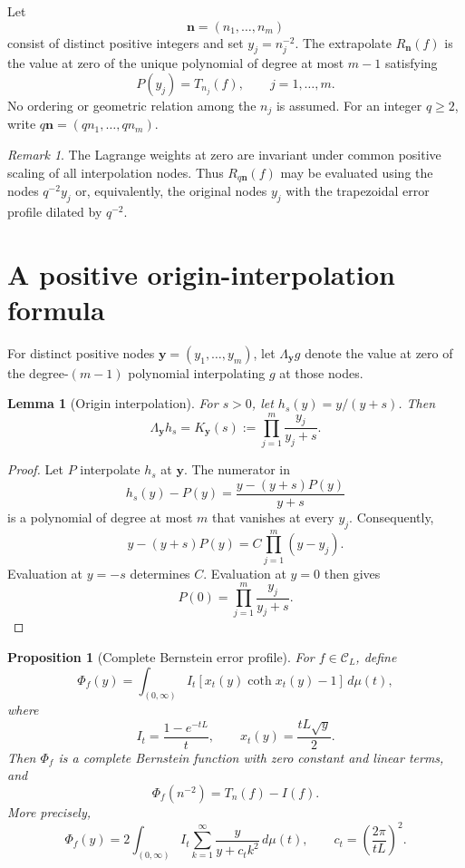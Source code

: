 \documentclass[11pt]{article}
\newtheorem{lemma}[theorem]{Lemma}
\newtheorem{proposition}[theorem]{Proposition}
\theoremstyle{definition}
\theoremstyle{remark}
\newtheorem{remark}[theorem]{Remark}
\newcommand{\cC}{\mathcal{C}}
\newcommand{\bN}{\boldsymbol{n}}
\newcommand{\bY}{\boldsymbol{y}}
\newcommand{\1}{\mathbf{1}}
\begin{document}
Let
\[
\bN=(n_1,\ldots,n_m)
\]
consist of distinct positive integers and set \(y_j=n_j^{-2}\). The
extrapolate \(R_{\bN}(f)\) is the value at zero of the unique polynomial of
degree at most \(m-1\) satisfying
\[
P(y_j)=T_{n_j}(f),\qquad j=1,\ldots,m.
\]
No ordering or geometric relation among the \(n_j\) is assumed. For an integer
\(q\ge2\), write \(q\bN=(qn_1,\ldots,qn_m)\).

\begin{remark}
The Lagrange weights at zero are invariant under common positive scaling of
all interpolation nodes. Thus \(R_{q\bN}(f)\) may be evaluated using the
nodes \(q^{-2}y_j\) or, equivalently, the original nodes \(y_j\) with the
trapezoidal error profile dilated by \(q^{-2}\).
\end{remark}

\section{A positive origin-interpolation formula}

For distinct positive nodes \(\bY=(y_1,\ldots,y_m)\), let
\(\Lambda_{\bY}g\) denote the value at zero of the degree-\((m-1)\)
polynomial interpolating \(g\) at those nodes.

\begin{lemma}[Origin interpolation]
\label{lem:origin}
For \(s>0\), let \(h_s(y)=y/(y+s)\). Then
\begin{equation}
\Lambda_{\bY}h_s
=K_{\bY}(s)
:=\prod_{j=1}^{m}\frac{y_j}{y_j+s}.
\label{eq:kernel}
\end{equation}
\end{lemma}

\begin{proof}
Let \(P\) interpolate \(h_s\) at \(\bY\). The numerator in
\[
h_s(y)-P(y)
=\frac{y-(y+s)P(y)}{y+s}
\]
is a polynomial of degree at most \(m\) that vanishes at every \(y_j\).
Consequently,
\[
y-(y+s)P(y)=C\prod_{j=1}^{m}(y-y_j).
\]
Evaluation at \(y=-s\) determines \(C\). Evaluation at \(y=0\) then gives
\[
P(0)=\prod_{j=1}^{m}\frac{y_j}{y_j+s}.
\]
\end{proof}

\begin{proposition}[Complete Bernstein error profile]
\label{prop:cbf}
For \(f\in\cC_L\), define
\begin{equation}
\Phi_f(y)
=
\int_{(0,\infty)}
I_t\left[x_t(y)\coth x_t(y)-1\right]\,d\mu(t),
\label{eq:error-profile}
\end{equation}
where
\[
I_t=\frac{1-e^{-tL}}{t},
\qquad
x_t(y)=\frac{tL\sqrt{y}}{2}.
\]
Then \(\Phi_f\) is a complete Bernstein function with zero constant and
linear terms, and
\begin{equation}
\Phi_f(n^{-2})=T_n(f)-I(f).
\label{eq:profile-samples}
\end{equation}
More precisely,
\begin{equation}
\Phi_f(y)
=
2\int_{(0,\infty)}
I_t\sum_{k=1}^{\infty}
\frac{y}{y+c_tk^2}\,d\mu(t),
\qquad
c_t=\left(\frac{2\pi}{tL}\right)^2.
\label{eq:cbf-representation}
\end{equation}
\end{proposition}
\end{document}

